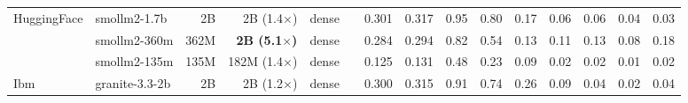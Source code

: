 \begin{longtable}{@{}ll r r l c rr rrrrrrr@{}}
HuggingFace & smollm2-1.7b & 2B & 2B (1.4$\times$) & dense &  & 0.301 & 0.317 & 0.95 & 0.80 & 0.17 & 0.06 & 0.06 & 0.04 & 0.03 \\
 & smollm2-360m & 362M & \textbf{2B (5.1$\times$)} & dense &  & 0.284 & 0.294 & 0.82 & 0.54 & 0.13 & 0.11 & 0.13 & 0.08 & 0.18 \\
 & smollm2-135m & 135M & 182M (1.4$\times$) & dense &  & 0.125 & 0.131 & 0.48 & 0.23 & 0.09 & 0.02 & 0.02 & 0.01 & 0.02 \\
Ibm & granite-3.3-2b & 2B & 2B (1.2$\times$) & dense &  & 0.300 & 0.315 & 0.91 & 0.74 & 0.26 & 0.09 & 0.04 & 0.02 & 0.04 \\
\end{longtable}
